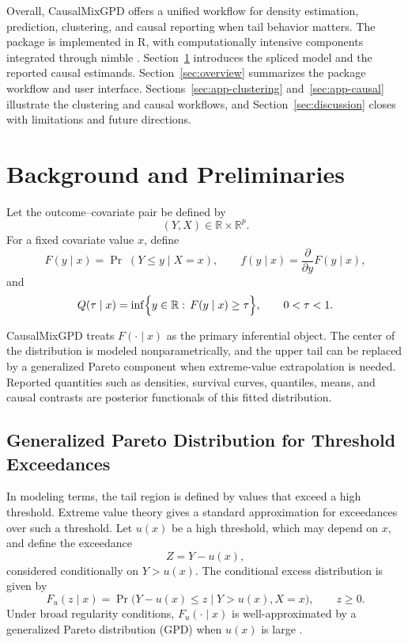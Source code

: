 \documentclass[article]{jss}\usepackage[]{graphicx}\usepackage[]{xcolor}
\DeclareRobustCommand{\pkg}[1]{\textsf{#1}}
\begin{document}
Overall, \pkg{CausalMixGPD} offers a unified workflow for
density estimation, prediction, clustering, and causal reporting when
tail behavior matters. The package is implemented in \textsf{R}, with
computationally intensive components integrated through
\pkg{nimble} \citep{nimble_pkg}. Section~\ref{sec:prelim} introduces
the spliced model and the reported causal estimands.
Section~\ref{sec:overview} summarizes the package workflow and user
interface. Sections~\ref{sec:app-clustering} and~\ref{sec:app-causal}
illustrate the clustering and causal workflows, and
Section~\ref{sec:discussion} closes with limitations and future
directions.


\section{Background and Preliminaries}
\label{sec:prelim}

Let the outcome--covariate pair be defined by
\begin{equation}
(Y,X) \in \mathbb{R}\times \mathbb{R}^p .
\end{equation}
For a fixed covariate value $x$, define
\begin{equation}
F(y\mid x)=\Pr\;(Y\le y\mid X=x),
\qquad
f(y\mid x)=\frac{\partial}{\partial y}F(y\mid x),
\end{equation}
and
\begin{equation}
Q(\tau\mid x)=\inf\Bigl\{y\in\mathbb{R}:\,F(y\mid x)\ge \tau\Bigr\},
\qquad 0<\tau<1.
\end{equation}

\pkg{CausalMixGPD} treats $F(\cdot\mid x)$ as the primary inferential
object. The center of the distribution is modeled nonparametrically, and
the upper tail can be replaced by a generalized Pareto component when
extreme-value extrapolation is needed. Reported quantities such as
densities, survival curves, quantiles, means, and causal contrasts are
posterior functionals of this fitted distribution.




\subsection{Generalized Pareto Distribution for Threshold Exceedances}
\label{subsec:gpd}

In modeling terms, the tail region is defined by values that exceed a
high threshold. Extreme value theory gives a standard approximation for
exceedances over such a threshold. Let $u(x)$ be a high threshold,
which may depend on $x$, and define the exceedance
\begin{equation}
Z = Y - u(x),
\end{equation}
considered conditionally on $Y > u(x)$. The conditional excess
distribution is given by
\begin{equation}
F_u(z\mid x) = \Pr\!\bigl(Y-u(x) \le z \mid Y>u(x), X=x\bigr),
\qquad z \ge 0.
\label{eq:cedf}
\end{equation}
Under broad regularity conditions, $F_u(\cdot\mid x)$ is
well-approximated by a generalized Pareto distribution (GPD) when
$u(x)$ is large \citep{BalkemaDeHaan1974,Pickands1975,Coles2001}.
\end{document}
